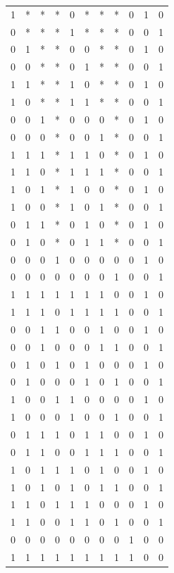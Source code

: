 \documentclass[oneside,a4paper,14pt]{extarticle}
\begin{document}
\begin{center}
\begin{longtable}{cccc|cccc|ccc}
    1 & * & * & * & 0 & * & * & * & 0 & 1 & 0 \\
    0 & * & * & * & 1 & * & * & * & 0 & 0 & 1 \\
    0 & 1 & * & * & 0 & 0 & * & * & 0 & 1 & 0 \\
    0 & 0 & * & * & 0 & 1 & * & * & 0 & 0 & 1 \\
    1 & 1 & * & * & 1 & 0 & * & * & 0 & 1 & 0 \\
    1 & 0 & * & * & 1 & 1 & * & * & 0 & 0 & 1 \\
    0 & 0 & 1 & * & 0 & 0 & 0 & * & 0 & 1 & 0 \\
    0 & 0 & 0 & * & 0 & 0 & 1 & * & 0 & 0 & 1 \\
    1 & 1 & 1 & * & 1 & 1 & 0 & * & 0 & 1 & 0 \\
    1 & 1 & 0 & * & 1 & 1 & 1 & * & 0 & 0 & 1 \\
    1 & 0 & 1 & * & 1 & 0 & 0 & * & 0 & 1 & 0 \\
    1 & 0 & 0 & * & 1 & 0 & 1 & * & 0 & 0 & 1 \\
    0 & 1 & 1 & * & 0 & 1 & 0 & * & 0 & 1 & 0 \\
    0 & 1 & 0 & * & 0 & 1 & 1 & * & 0 & 0 & 1 \\
    0 & 0 & 0 & 1 & 0 & 0 & 0 & 0 & 0 & 1 & 0 \\
    0 & 0 & 0 & 0 & 0 & 0 & 0 & 1 & 0 & 0 & 1 \\
    1 & 1 & 1 & 1 & 1 & 1 & 1 & 0 & 0 & 1 & 0 \\
    1 & 1 & 1 & 0 & 1 & 1 & 1 & 1 & 0 & 0 & 1 \\
    0 & 0 & 1 & 1 & 0 & 0 & 1 & 0 & 0 & 1 & 0 \\
    0 & 0 & 1 & 0 & 0 & 0 & 1 & 1 & 0 & 0 & 1 \\
    0 & 1 & 0 & 1 & 0 & 1 & 0 & 0 & 0 & 1 & 0 \\
    0 & 1 & 0 & 0 & 0 & 1 & 0 & 1 & 0 & 0 & 1 \\
    1 & 0 & 0 & 1 & 1 & 0 & 0 & 0 & 0 & 1 & 0 \\
    1 & 0 & 0 & 0 & 1 & 0 & 0 & 1 & 0 & 0 & 1 \\
    0 & 1 & 1 & 1 & 0 & 1 & 1 & 0 & 0 & 1 & 0 \\
    0 & 1 & 1 & 0 & 0 & 1 & 1 & 1 & 0 & 0 & 1 \\
    1 & 0 & 1 & 1 & 1 & 0 & 1 & 0 & 0 & 1 & 0 \\
    1 & 0 & 1 & 0 & 1 & 0 & 1 & 1 & 0 & 0 & 1 \\
    1 & 1 & 0 & 1 & 1 & 1 & 0 & 0 & 0 & 1 & 0 \\
    1 & 1 & 0 & 0 & 1 & 1 & 0 & 1 & 0 & 0 & 1 \\
    0 & 0 & 0 & 0 & 0 & 0 & 0 & 0 & 1 & 0 & 0 \\
    1 & 1 & 1 & 1 & 1 & 1 & 1 & 1 & 1 & 0 & 0 \\
  \end{longtable}
\end{center}
\end{document}
